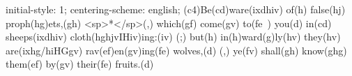 initial-style: 1;
centering-scheme: english;
(c4)Be(cd)ware(ixdhiv) of(h) false(hj) proph(hg)ets,(gh) <sp>*</sp>(,) which(gf) come(gv) to(fe~) you(d) in(cd) sheeps(ixdhiv) cloth(hghjvIHiv)ing:(iv) (;) but(h) in(h)ward(g)ly(hv) they(hv) are(ixhg/hiHGgv) rav(ef)en(gv)ing(fe) wolves,(d) (,) ye(fv) shall(gh) know(ghg) them(ef) by(gv) their(fe) fruits.(d)
